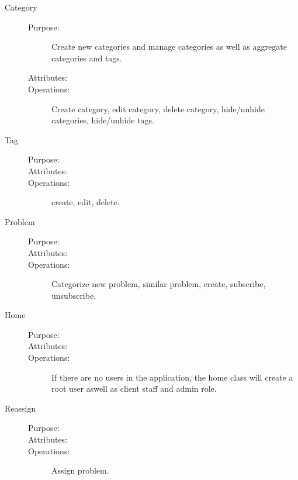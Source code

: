 \begin{description}
\item[Category]\hfill
\begin{description}
\item[Purpose:]Create new categories and manage categories as well as aggregate categories and tags.
\item[Attributes:]
\item[Operations:]Create category, edit category, delete category, hide/unhide categories, hide/unhide tags.
\end{description}
\end{description}

\begin{description}
\item[Tag]\hfill
\begin{description}
\item[Purpose:]
\item[Attributes:]
\item[Operations:]create, edit, delete.
\end{description}
\end{description}

\begin{description}
\item[Problem]\hfill
\begin{description}
\item[Purpose:]
\item[Attributes:]
\item[Operations:]Categorize new problem, similar problem, create, subscribe, unsubscribe.
\end{description}
\end{description}

\begin{description}
\item[Home]\hfill
\begin{description}
\item[Purpose:]
\item[Attributes:]
\item[Operations:] If there are no users in the application, the home class will create a root user aswell as client staff and admin role.
\end{description}
\end{description}


\begin{description}
\item[Reassign]\hfill
\begin{description}
\item[Purpose:]
\item[Attributes:]
\item[Operations:] Assign problem.
\end{description}
\end{description}

